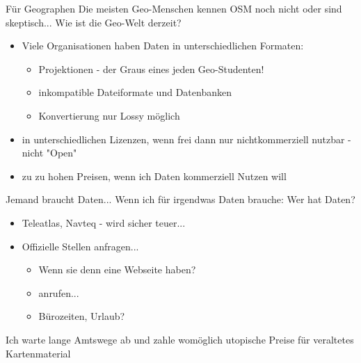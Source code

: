 \documentclass{beamer}
\begin{document}
\begin{frame}{Für Geographen}
	Die meisten Geo-Menschen kennen OSM noch nicht oder sind skeptisch...
	\pause
	\vspace{5mm}
	Wie ist die Geo-Welt derzeit?
	\pause
	\begin{itemize}
		\item Viele Organisationen haben Daten in unterschiedlichen Formaten:
			\begin{itemize}
				\item Projektionen - der Graus eines jeden Geo-Studenten!
				\item inkompatible Dateiformate und Datenbanken
				\item Konvertierung nur Lossy möglich
			\end{itemize}
		\item in unterschiedlichen Lizenzen, wenn frei dann nur nichtkommerziell nutzbar - nicht "Open"
		\item zu zu hohen Preisen, wenn ich Daten kommerziell Nutzen will
	\end{itemize}
\end{frame}

\begin{frame}{Jemand braucht Daten...}
	Wenn ich für irgendwas Daten brauche:
	\vspace{5mm}
	Wer hat Daten?
	
	\begin{itemize}
		\item Teleatlas, Navteq - wird sicher teuer...
			\pause
		\item Offizielle Stellen anfragen...
			\begin{itemize}
				\item Wenn sie denn eine Webseite haben?
				\item anrufen...
				\item Bürozeiten, Urlaub?
			\end{itemize}
	\end{itemize}
	Ich warte lange Amtswege ab und zahle womöglich utopische Preise für veraltetes Kartenmaterial
\end{frame}
\end{document}
